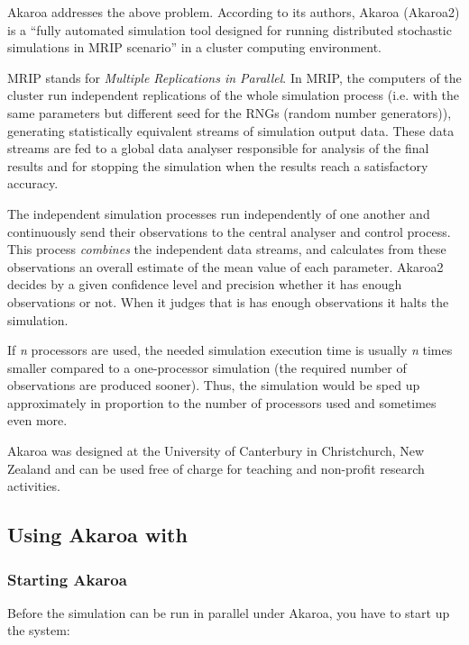 Akaroa \cite{Akaroa99} addresses the above problem.
According to its authors, Akaroa (Akaroa2) is a ``fully automated
simulation tool designed for running distributed stochastic simulations
in MRIP scenario'' in a cluster computing environment.

MRIP stands for \textit{Multiple Replications in Parallel}.
In MRIP, the computers of the cluster run independent replications
of the whole simulation process (i.e. with the same parameters but
different seed for the RNGs (random number generators)),
generating statistically equivalent streams of simulation output data.
These data streams are fed to a global data analyser responsible for
analysis of the final results and for stopping the simulation
when the results reach a satisfactory accuracy.

The independent simulation processes run independently of one another
and continuously send their observations to the central analyser
and control process. This process \textit{combines} the independent data streams,
and calculates from these observations an overall estimate of the mean value
of each parameter.
Akaroa2 decides by a given confidence level and precision
whether it has enough observations or not. When it judges that is
has enough observations it halts the simulation.

If \textit{n} processors are used, the needed simulation execution time
is usually \textit{n} times smaller compared to a one-processor
simulation (the required number of observations are produced sooner).
Thus, the simulation would be sped up approximately in proportion
to the number of processors used and sometimes even more.

Akaroa was designed at the University of Canterbury in Christchurch, New Zealand
and can be used free of charge for teaching and non-profit research activities.


\subsection{Using Akaroa with {\opp}}
\label{sec:run-sim:using-akaroa}

\subsubsection{Starting Akaroa}
\label{sec:run-sim:starting-up-akaroa}

Before the simulation can be run in parallel under Akaroa, you have to
start up the system:

